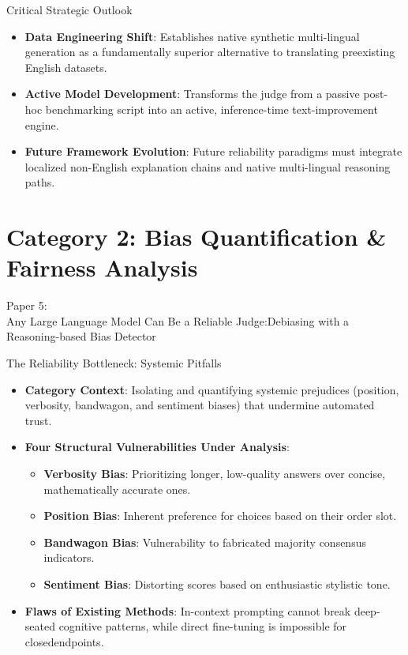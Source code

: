 \documentclass[10pt]{beamer}
\begin{document}
\begin{frame}{Critical Strategic Outlook}
  \begin{itemize}
    \item \textbf{Data Engineering Shift}: Establishes native synthetic multi-lingual generation as a fundamentally superior alternative to translating preexisting English datasets.
    \item \textbf{Active Model Development}: Transforms the judge from a passive post-hoc benchmarking script into an active, inference-time text-improvement engine.
    \item \textbf{Future Framework Evolution}: Future reliability paradigms must integrate localized non-English explanation chains and native multi-lingual reasoning paths.
  \end{itemize}
\end{frame}

\section{Category 2: Bias Quantification \& Fairness Analysis}


\begin{frame}[standout]
  \hypertarget{paper5}{}
  \Large Paper 5:\\Any Large Language Model Can Be a Reliable Judge:Debiasing with a Reasoning-based Bias Detector
\end{frame}

\begin{frame}{The Reliability Bottleneck: Systemic Pitfalls}
  \begin{itemize}
    \item \textbf{Category Context}: Isolating and quantifying systemic prejudices (position, verbosity, bandwagon, and sentiment biases) that undermine automated trust.
    \item \textbf{Four Structural Vulnerabilities Under Analysis}:
      \begin{itemize}
        \item \textbf{Verbosity Bias}: Prioritizing longer, low-quality answers over concise, mathematically accurate ones.
        \item \textbf{Position Bias}: Inherent preference for choices based on their order slot.
        \item \textbf{Bandwagon Bias}: Vulnerability to fabricated majority consensus indicators.
        \item \textbf{Sentiment Bias}: Distorting scores based on enthusiastic stylistic tone.
      \end{itemize}
    \item \textbf{Flaws of Existing Methods}: In-context prompting cannot break deep-seated cognitive patterns, while direct fine-tuning is impossible for closedendpoints.
  \end{itemize}
\end{frame}
\end{document}
